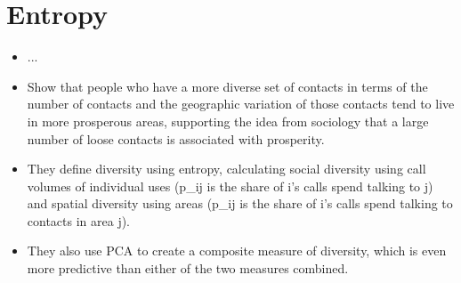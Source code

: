 

\section{Entropy}%
\label{sec:entropy}

\citet{krumme2013predictability}
\begin{itemize}
    \item ...
\end{itemize}

\citet{eagle2010network}
\begin{itemize}
    \item Show that people who have a more diverse set of contacts in terms of
        the number of contacts and the geographic variation of those contacts
        tend to live in more prosperous areas, supporting the idea from
        sociology that a large number of loose contacts is associated with
        prosperity.

    \item They define diversity using entropy, calculating social diversity
        using call volumes of individual uses (p_ij is the share of i's calls
        spend talking to j) and spatial diversity using areas (p_ij is the
        share of i's calls spend talking to contacts in area j).

    \item They also use PCA to create a composite measure of diversity, which
        is even more predictive than either of the two measures combined.
\end{itemize}



